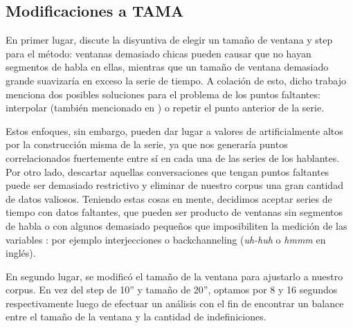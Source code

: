 \subsection{Modificaciones a TAMA}
\label{sec:tama_modifications}

En primer lugar, \cite{KOU2008.2} discute la disyuntiva de elegir un tamaño de ventana y step para el método: ventanas demasiado chicas pueden causar que no hayan segmentos de habla en ellas, mientras que un tamaño de ventana demasiado grande suavizaría en exceso la serie de tiempo. A colación de esto, dicho trabajo menciona dos posibles soluciones para el problema de los puntos faltantes: interpolar (también mencionado en \cite{DEL2013}) o repetir el punto anterior de la serie.

Estos enfoques, sin embargo, pueden dar lugar a valores de \entrainment artificialmente altos por la construcción misma de la serie, ya que nos generaría puntos correlacionados fuertemente entre sí en cada una de las series de los hablantes. Por otro lado, descartar aquellas conversaciones que tengan puntos faltantes puede ser demasiado restrictivo y eliminar de nuestro corpus una gran cantidad de datos valiosos. Teniendo estas cosas en mente, decidimos aceptar series de tiempo con datos faltantes, que pueden ser producto de ventanas sin segmentos de habla o con algunos demasiado pequeños que imposibiliten la medición de las variables \ap: por ejemplo interjecciones o backchanneling (\emph{uh-huh} o \emph{hmmm} en inglés).

En segundo lugar, se modificó el tamaño de la ventana para ajustarlo a nuestro corpus. En vez del step de 10'' y tamaño de 20'', optamos por 8 y 16 segundos respectivamente luego de efectuar un análisis con el fin de encontrar un balance entre el tamaño de la ventana y la cantidad de indefiniciones.